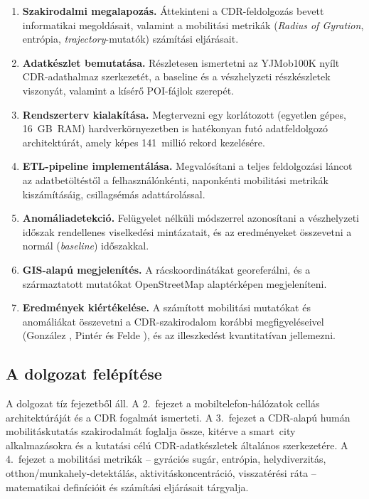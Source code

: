 \begin{enumerate}
    \item \textbf{Szakirodalmi megalapozás.} Áttekinteni a CDR-feldolgozás bevett informatikai megoldásait, valamint a mobilitási metrikák (\textit{Radius of Gyration}, entrópia, \textit{trajectory}-mutatók) számítási eljárásait.

    \item \textbf{Adatkészlet bemutatása.} Részletesen ismertetni az YJMob100K nyílt CDR-adathalmaz szerkezetét, a baseline és a vészhelyzeti részkészletek viszonyát, valamint a kísérő POI-fájlok szerepét.

    \item \textbf{Rendszerterv kialakítása.} Megtervezni egy korlátozott (egyetlen gépes, 16~GB~RAM) hardverkörnyezetben is hatékonyan futó adatfeldolgozó architektúrát, amely képes 141~millió rekord kezelésére.

    \item \textbf{ETL-pipeline implementálása.} Megvalósítani a teljes feldolgozási láncot az adatbetöltéstől a felhasználónkénti, naponkénti mobilitási metrikák kiszámításáig, csillagsémás adattárolással.

    \item \textbf{Anomáliadetekció.} Felügyelet nélküli módszerrel azonosítani a vészhelyzeti időszak rendellenes viselkedési mintázatait, és az eredményeket összevetni a normál (\textit{baseline}) időszakkal.

    \item \textbf{GIS-alapú megjelenítés.} A rácskoordinátákat georeferálni, és a származtatott mutatókat OpenStreetMap alaptérképen megjeleníteni.

    \item \textbf{Eredmények kiértékelése.} A számított mobilitási mutatókat és anomáliákat összevetni a CDR-szakirodalom korábbi megfigyeléseivel (Gonz\'alez \cite{gonzalez2008understanding}, Pintér és Felde \cite{pinter2021evaluating, pinter2022awakening}), és az illeszkedést kvantitatívan jellemezni.
\end{enumerate}

\subsection{A dolgozat felépítése}
\label{subsec:structure}

A dolgozat tíz fejezetből áll. A 2.\ fejezet a mobiltelefon-hálózatok cellás architektúráját és a CDR fogalmát ismerteti. A 3.\ fejezet a CDR-alapú humán mobilitáskutatás szakirodalmát foglalja össze, kitérve a smart~city alkalmazásokra és a kutatási célú CDR-adatkészletek általános szerkezetére. A 4.\ fejezet a mobilitási metrikák -- gyrációs sugár, entrópia, helydiverzitás, otthon/munkahely-detektálás, aktivitáskoncentráció, visszatérési ráta -- matematikai definícióit és számítási eljárásait tárgyalja.

